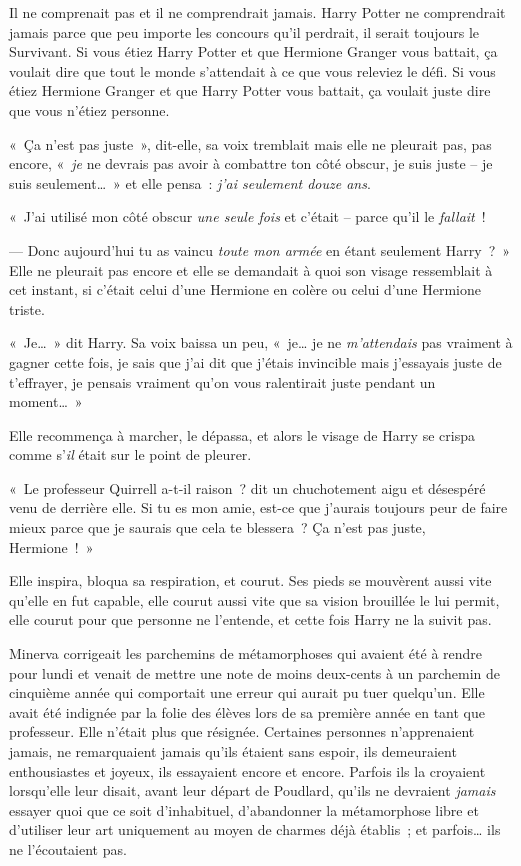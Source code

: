 Il ne comprenait pas et il ne comprendrait jamais. Harry Potter ne comprendrait jamais parce que peu importe les concours qu'il perdrait, il serait toujours le Survivant. Si vous étiez Harry Potter et que Hermione Granger vous battait, ça voulait dire que tout le monde s'attendait à ce que vous releviez le défi. Si vous étiez Hermione Granger et que Harry Potter vous battait, ça voulait juste dire que vous n'étiez personne.

«~Ça n'est pas juste~», dit-elle, sa voix tremblait mais elle ne pleurait pas, pas encore, «~\emph{je} ne devrais pas avoir à combattre ton côté obscur, je suis juste -- je suis seulement…~» et elle pensa~: \emph{j'ai seulement douze ans}.

«~J'ai utilisé mon côté obscur \emph{une seule fois} et c'était -- parce qu'il le \emph{fallait}~!

--- Donc aujourd'hui tu as vaincu \emph{toute mon armée} en étant seulement Harry~?~» Elle ne pleurait pas encore et elle se demandait à quoi son visage ressemblait à cet instant, si c'était celui d'une Hermione en colère ou celui d'une Hermione triste.

«~Je…~» dit Harry. Sa voix baissa un peu, «~je… je ne \emph{m'attendais} pas vraiment à gagner cette fois, je sais que j'ai dit que j'étais invincible mais j'essayais juste de t'effrayer, je pensais vraiment qu'on vous ralentirait juste pendant un moment…~»

Elle recommença à marcher, le dépassa, et alors le visage de Harry se crispa comme s'\emph{il} était sur le point de pleurer.

«~Le professeur Quirrell a-t-il raison~? dit un chuchotement aigu et désespéré venu de derrière elle. Si tu es mon amie, est-ce que j'aurais toujours peur de faire mieux parce que je saurais que cela te blessera~? Ça n'est pas juste, Hermione~!~»

Elle inspira, bloqua sa respiration, et courut. Ses pieds se mouvèrent aussi vite qu'elle en fut capable, elle courut aussi vite que sa vision brouillée le lui permit, elle courut pour que personne ne l'entende, et cette fois Harry ne la suivit pas.

\later

Minerva corrigeait les parchemins de métamorphoses qui avaient été à rendre pour lundi et venait de mettre une note de moins deux-cents à un parchemin de cinquième année qui comportait une erreur qui aurait pu tuer quelqu'un. Elle avait été indignée par la folie des élèves lors de sa première année en tant que professeur. Elle n'était plus que résignée. Certaines personnes n'apprenaient jamais, ne remarquaient jamais qu'ils étaient sans espoir, ils demeuraient enthousiastes et joyeux, ils essayaient encore et encore. Parfois ils la croyaient lorsqu'elle leur disait, avant leur départ de Poudlard, qu'ils ne devraient \emph{jamais} essayer quoi que ce soit d'inhabituel, d'abandonner la métamorphose libre et d'utiliser leur art uniquement au moyen de charmes déjà établis~; et parfois… ils ne l'écoutaient pas.

